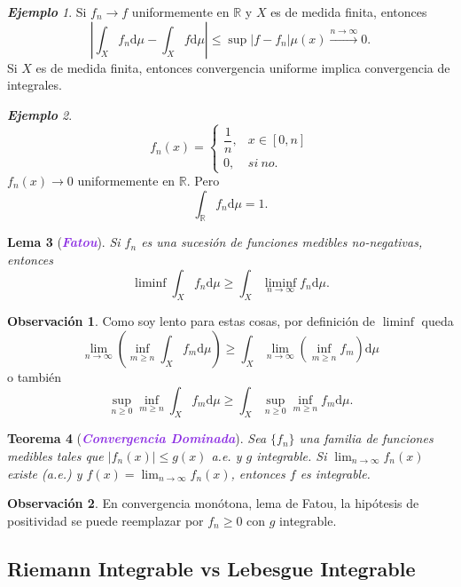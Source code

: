 \documentclass{article}
\newtheorem{theorem}{Teorema}[subsection]
\newtheorem{lemma}[theorem]{Lema}
\theoremstyle{definition}
\newtheorem*{obs}{Observación}
\theoremstyle{remark}
\newtheorem{example}[theorem]{\textbf{Ejemplo}}
\numberwithin{equation}{section}
\newcommand{\R}{\mathbb{R}}
\renewcommand{\d}{\mathrm{d}}
\newcommand{\oo}{\infty}
\newcommand{\abs}[1]{\left| #1 \right|}
\newcommand{\br}[1]{\left( #1 \right)}
\newcommand{\wea}[1]{\textcolor{BlueViolet}{\textbf{\emph{#1}}}}
\begin{document}
\begin{example}
  Si $f_n \to f$ uniformemente en $\R$ y $X$ es de medida finita, entonces 
  \[ \abs{\int_X f_n \d\mu - \int_X f \d\mu} \leq \sup \abs{f-f_n} \mu(x) \xrightarrow{n\to\oo} 0. \]
  Si $X$ es de medida finita, entonces convergencia uniforme implica convergencia de integrales.
\end{example}

\begin{example}
  $$f_n(x) = \begin{cases}
    \dfrac{1}{n}, &x \in [0,n] \\
    0, &si \ no.
  \end{cases}$$
  $f_n(x) \to 0$ uniformemente en $\R$. Pero 
  \[ \int_\R f_n \d\mu = 1. \]
\end{example}

\begin{lemma}
  [\wea{Fatou}]
  Si $f_n$ es una sucesión de funciones medibles no-negativas, entonces 
  \[ \liminf \int_X f_n \d\mu \geq \int_X \liminf_{n\to\oo} f_n \d\mu. \]
\end{lemma}

\begin{obs}
  Como soy lento para estas cosas, por definición de $\liminf$ queda 
  \[ \lim_{n\to\oo} \br{\inf_{m\geq n} \int_X f_m \d\mu} \geq \int_X \lim_{n\to\oo} \br{\inf_{m \geq n} f_m} \d\mu \]
  o también 
  \[ \sup_{n \geq 0} \inf_{m \geq n} \int_X f_m \d\mu \geq \int_X \sup_{n \geq 0} \inf_{m \geq n} f_m \d\mu. \]
\end{obs}

\begin{theorem}[\wea{Convergencia Dominada}]
  Sea $\{f_n\}$ una familia de funciones medibles tales que $\abs{f_n(x)} \leq g(x)$ a.e. y $g$ integrable. Si $\lim_{n\to\oo} f_n(x)$ existe (a.e.) y $f(x) = \lim_{n\to\oo} f_n(x)$, entonces $f$ es integrable.
\end{theorem}

\begin{obs}
  En convergencia monótona, lema de Fatou, la hipótesis de positividad se puede reemplazar por $f_n \geq 0$ con $g$ integrable.
\end{obs}

\newpage
\subsection{Riemann Integrable vs Lebesgue Integrable}
\end{document}

